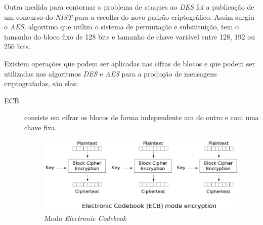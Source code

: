 Outra medida para contornar o problema de ataques ao \textit{DES} foi a publicação de um concurso do \textit{NIST} para a escolha do novo padrão criptográfico. Assim surgiu o \textit{AES}, algoritmo que utiliza o sistema de permutação e substituição, tem o tamanho do bloco fixo de 128 bits e tamanho de chave variável entre 128, 192 ou 256 bits. 

Existem operações que podem ser aplicadas nas cifras de blocos e que podem ser utilizadas nos algoritmos \textit{DES} e \textit{AES} para a produção de mensagens criptografadas, são elas:

\begin{description}
\item [ECB]consiste em cifrar os blocos de forma independente um do outro e com uma chave fixa.
\begin{figure}[h]
\centering
\includegraphics[keepaspectratio=true,scale=0.7]
	{figuras/ecb.eps}
	\caption[Modo Electronic Codebook]{Modo \textit{Electronic Codebook}\protect\footnotemark}
	

\end{figure}
\end{description}
